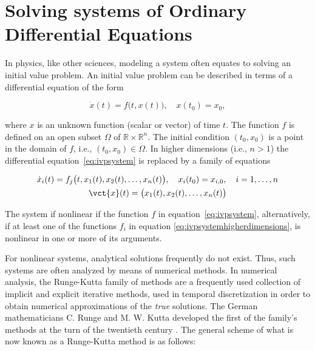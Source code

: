 \section{Solving systems of Ordinary Differential Equations}
\label{sec:solvingsystems}

In physics, like other sciences, modeling a system often equates to solving
an initial value problem. An initial value problem can be described in terms
of a differential equation of the form

\begin{equation}
    \label{eq:ivpsystem}
    \dot{x}(t) = f\big(t,x(t)\big),\quad{}x(t_{0})=x_{0},
\end{equation}

where $x$ is an unknown function (scalar or vector) of time $t$. The function
$f$ is defined on an open subset $\Omega$ of $\mathbb{R}\times\mathbb{R}^{n}$.
The initial condition $(t_{0},x_{0})$ is a point in the domain of $f$, i.e.,
$(t_{0},x_{0})\in\Omega$. In higher dimensions (i.e., $n>1$) the differential
equation~\eqref{eq:ivpsystem} is replaced by a family of equations

\begin{equation}
\label{eq:ivpsystemhigherdimensions}
\begin{gathered}
    \dot{x}_{i}(t) = f_{j}\big(t,x_{1}(t),x_{2}(t),\ldots,x_{n}(t)\big),\quad
    x_{i}(t_{0})=x_{i,0},\quad{}i=1,\ldots,n \\
    \vct{x}(t) = \big(x_{1}(t),x_{2}(t),\ldots,x_{n}(t)\big)
\end{gathered}
\end{equation}

The system if nonlinear if the function $f$ in equation~\eqref{eq:ivpsystem},
alternatively, if at least one of the functions $f_{i}$ in equation
\eqref{eq:ivpsystemhigherdimensions}, is nonlinear in one or more of its
arguments.

For nonlinear systems, analytical solutions frequently do not exist. Thus, such
systems are often analyzed by means of numerical methods. In numerical analysis,
the Runge-Kutta family of methods are a frequently used collection of implicit
and explicit iterative methods, used in temporal discretization in order to
obtain numerical approximations of the \emph{true} solutions. The German
mathematicians C. Runge and M. W. Kutta developed the first of the family's
methods at the turn of the twentieth century
\parencite[p.134 in the 2008 printing]{hairer1993solving}. The general scheme of
what is now known as a Runge-Kutta method is as follows: \\

